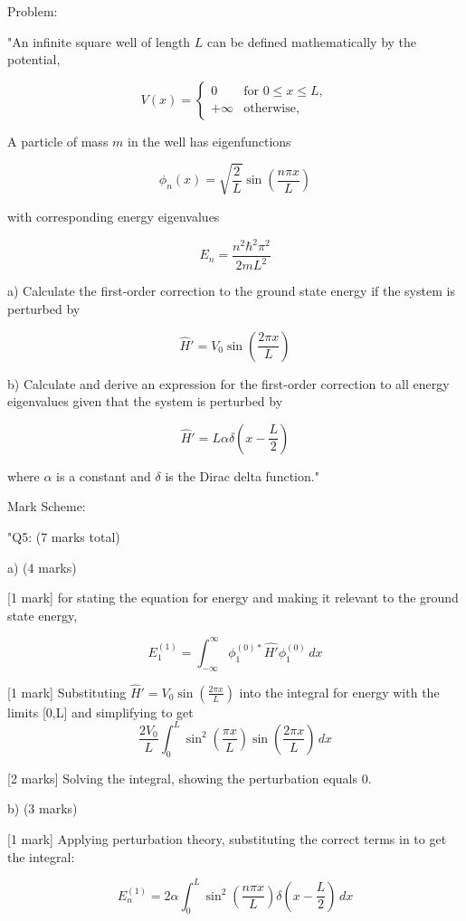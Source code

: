 Problem:

"An infinite square well of length \( L \) can be defined mathematically by the potential,

\[ V(x) = \begin{cases}
0 & \text{for } 0 \leq x \leq L,\\
+\infty  & \text{otherwise,} 
\end{cases} \]

A particle of mass \( m \) in the well has eigenfunctions

\[ \phi_{n}(x) = \sqrt{\frac{2}{L}} \sin\left(\frac{n \pi x}{L} \right) \]

with corresponding energy eigenvalues 

\[ E_{n} = \frac{n^{2}\hbar^{2}\pi^{2}}{2mL^{2}} \]

a) Calculate the first-order correction to the ground state energy if the system is perturbed by 

\[ \hat{H}' = V_{0} \sin\left(\frac{2 \pi x}{L} \right) \]

b) Calculate and derive an expression for the first-order correction to all energy eigenvalues given that the system is perturbed by 

\[ \hat{H}' = L\alpha \delta\left(x - \frac{L}{2} \right) \]

where \( \alpha \) is a constant and \( \delta \) is the Dirac delta function."

Mark Scheme:

"{Q5: (7 marks total)}

a) (4 marks)

[1 mark] for stating the equation for energy and making it relevant to the ground state energy, 

\[ E_{1}^{(1)} = \int_{-\infty}^{\infty} \phi_{1}^{(0)*}\hat{H'}\phi_{1}^{(0)} \, dx \]

[1 mark] Substituting \( \hat{H}' = V_{0} \sin\left(\frac{2 \pi x}{L} \right) \) into the integral for energy with the limits [0,L] and simplifying to get \[ \frac{2V_{0}}{L} \int_{0}^{L} \sin^{2}\left(\frac{ \pi x}{L} \right)\sin\left(\frac{ 2\pi x}{L} \right) \, dx \]

[2 marks] Solving the integral, showing the perturbation equals 0.

b) (3 marks)

[1 mark] Applying perturbation theory, substituting the correct terms in to get the integral: 

\[ E_{n}^{(1)} = 2 \alpha \int_{0}^{L} \sin^{2}\left(\frac{n \pi x}{L} \right) \delta\left(x - \frac{L}{2} \right) \, dx \]

